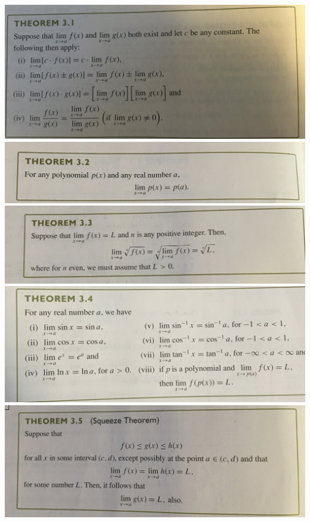 \documentclass{article}
\begin{document}
    \includegraphics[width=\linewidth]{Pre-Reading/Chapter 1/IMG_0953.JPG}
    \includegraphics[width=\linewidth]{Pre-Reading/Chapter 1/IMG_0958.JPG}
    \includegraphics[width=\linewidth]{Pre-Reading/Chapter 1/IMG_0959.JPG}
    \includegraphics[width=\linewidth]{Pre-Reading/Chapter 1/IMG_0960.JPG}
    \includegraphics[width=\linewidth]{Pre-Reading/Chapter 1/IMG_0961.JPG}
\end{document}
